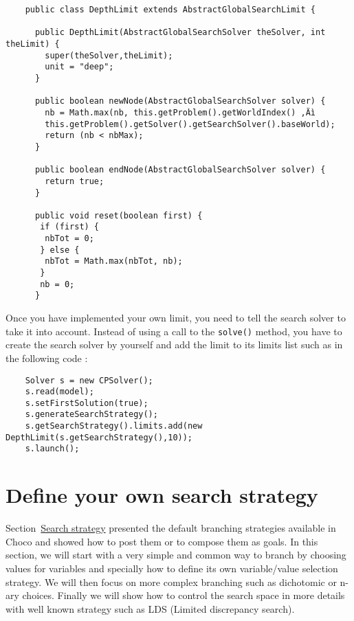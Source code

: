 \begin{lstlisting}
	public class DepthLimit extends AbstractGlobalSearchLimit {
	
	  public DepthLimit(AbstractGlobalSearchSolver theSolver, int theLimit) {
	    super(theSolver,theLimit);
	    unit = "deep";
	  }
	
	  public boolean newNode(AbstractGlobalSearchSolver solver) {
	    nb = Math.max(nb, this.getProblem().getWorldIndex() ‚Äì
	    this.getProblem().getSolver().getSearchSolver().baseWorld);
	    return (nb < nbMax);
	  }
	
	  public boolean endNode(AbstractGlobalSearchSolver solver) {
	    return true;
	  }
	
	  public void reset(boolean first) {
	   if (first) {
	    nbTot = 0;
	   } else {
	    nbTot = Math.max(nbTot, nb);
	   }
	   nb = 0;
	  }
\end{lstlisting}

Once you have implemented your own limit, you need to tell the search solver to take it into account. Instead of using a call to the \texttt{solve()} method, you have to create the search solver by yourself and add the limit to its limits list such as in the following code :
\begin{lstlisting}
	Solver s = new CPSolver();
	s.read(model);
	s.setFirstSolution(true);
	s.generateSearchStrategy();
	s.getSearchStrategy().limits.add(new DepthLimit(s.getSearchStrategy(),10));
	s.launch();
\end{lstlisting}

\section{Define your own search strategy}\label{advanced:defineyourownsearchstrategy}\hypertarget{advanced:defineyourownsearchstrategy}{}
Section~\hyperlink{solver:searchstrategy}{Search strategy} presented the default branching strategies available in Choco and showed how to post them or to compose them as goals.
In this section, we will start with a very simple and common way to branch by choosing values for variables and specially how to define its own variable/value selection strategy. We will then focus on more complex branching such as dichotomic or n-ary choices. Finally we will show how to control the search space in more details with well known strategy such as LDS (Limited discrepancy search).

